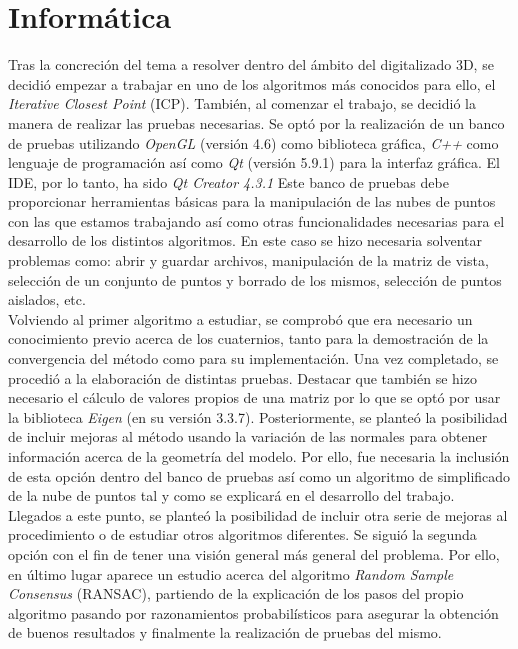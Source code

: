 \section*{Informática}
Tras la concreción del tema a resolver dentro del ámbito del digitalizado 3D, se decidió empezar a trabajar en uno de los algoritmos más conocidos para ello, el \textit{Iterative Closest Point} (ICP). También, al comenzar el trabajo, se decidió la manera de realizar las pruebas necesarias. Se optó por la realización de un banco de pruebas utilizando \textit{OpenGL} (versión 4.6) como biblioteca gráfica, \textit{C++} como lenguaje de programación así como \textit{Qt} (versión 5.9.1) para la interfaz gráfica. El IDE, por lo tanto, ha sido \textit{Qt Creator 4.3.1} Este banco de pruebas debe proporcionar herramientas básicas para la manipulación de las nubes de puntos con las que estamos trabajando así como otras funcionalidades necesarias para el desarrollo de los distintos algoritmos. En este caso se hizo necesaria solventar problemas como: abrir y guardar archivos, manipulación de la matriz de vista, selección de un conjunto de puntos y borrado de los mismos, selección de puntos aislados, etc.\\

Volviendo al primer algoritmo a estudiar, se comprobó que era necesario un conocimiento previo acerca de los cuaternios, tanto para la demostración de la convergencia del método como para su implementación. Una vez completado, se procedió a la elaboración de distintas pruebas. Destacar que también se hizo necesario el cálculo de valores propios de una matriz por lo que se optó por usar la biblioteca \textit{Eigen} (en su versión 3.3.7). Posteriormente, se planteó la posibilidad de incluir mejoras al método usando la variación de las normales para obtener información acerca de la geometría del modelo. Por ello, fue necesaria la inclusión de esta opción dentro del banco de pruebas así como un algoritmo de simplificado de la nube de puntos tal y como se explicará en el desarrollo del trabajo. \\

Llegados a este punto, se planteó la posibilidad de incluir otra serie de mejoras al procedimiento o de estudiar otros algoritmos diferentes. Se siguió la segunda opción con el fin de tener una visión general más general del problema. Por ello, en último lugar aparece un estudio acerca del algoritmo \textit{Random Sample Consensus} (RANSAC), partiendo de la explicación de los pasos del propio algoritmo pasando por razonamientos probabilísticos para asegurar la obtención de buenos resultados y finalmente la realización de pruebas del mismo.